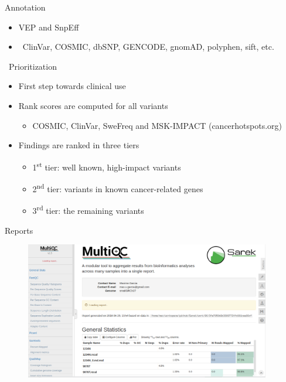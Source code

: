 \documentclass[usepdftitle=false]{beamer}
\newcommand{\ts}{\textsuperscript}
\begin{document}
\begin{frame}{Annotation}
	\begin{itemize}
		\item VEP and SnpEff
		\pause
		\item \faDatabase\ ClinVar, COSMIC, dbSNP, GENCODE, gnomAD, polyphen, sift, etc.
	\end{itemize}
\end{frame}

\begin{frame}{\faWrench\ Prioritization}
	\begin{itemize}
		\item	First step towards clinical use
		\pause
		\item	Rank scores are computed for all variants
		\begin{itemize}
			\item	COSMIC, ClinVar, SweFreq and MSK-IMPACT (cancerhotspots.org)
		\end{itemize}
		\pause
		\item	Findings are ranked in three tiers
		\pause
		\begin{itemize}
			\item	1\ts{st} tier: well known, high-impact variants
			\item	2\ts{nd} tier: variants in known cancer-related genes
			\item	3\ts{rd} tier: the remaining variants
		\end{itemize}
	\end{itemize}
\end{frame}

\begin{frame}{Reports}
	\begin{figure}
		\includegraphics[height=6cm]{pictures/MultiQC_screenshot-2018-07-02.png}
	\end{figure}
\end{frame}
\end{document}
